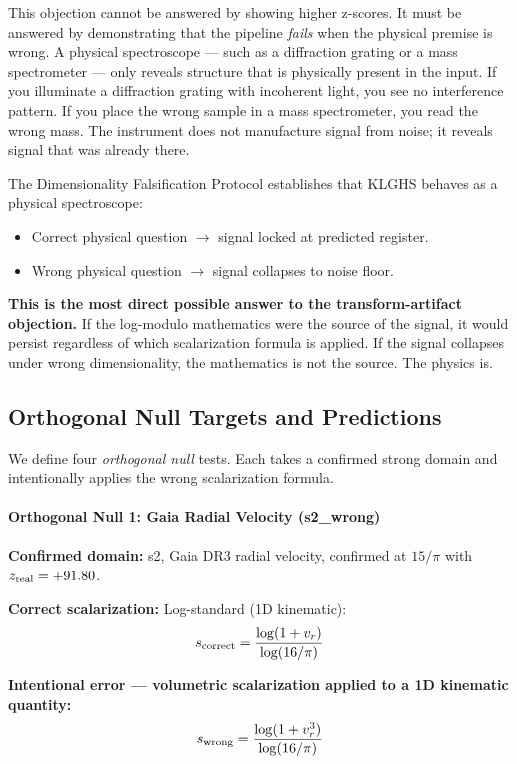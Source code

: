 \documentclass[12pt,a4paper]{article}
\begin{document}
This objection cannot be answered by showing higher z-scores. It must be
answered by demonstrating that the pipeline \emph{fails} when the physical
premise is wrong. A physical spectroscope --- such as a diffraction grating or a mass
spectrometer --- only reveals structure that is physically present in the input.
If you illuminate a diffraction grating with incoherent light, you see no
interference pattern. If you place the wrong sample in a mass spectrometer, you
read the wrong mass. The instrument does not manufacture signal from noise; it
reveals signal that was already there.

The Dimensionality Falsification Protocol establishes that KLGHS behaves as a
physical spectroscope:
\begin{itemize}
  \item Correct physical question $\rightarrow$ signal locked at predicted register.
  \item Wrong physical question $\rightarrow$ signal collapses to noise floor.
\end{itemize}

\textbf{This is the most direct possible answer to the transform-artifact
objection.} If the log-modulo mathematics were the source of the signal, it
would persist regardless of which scalarization formula is applied. If the
signal collapses under wrong dimensionality, the mathematics is not the source.
The physics is.

\subsection{Orthogonal Null Targets and Predictions}

We define four \emph{orthogonal null} tests. Each takes a confirmed strong
domain and intentionally applies the wrong scalarization formula.
\vspace{0.5em}

\paragraph{Orthogonal Null 1: Gaia Radial Velocity (s2\_wrong)}

\textbf{Confirmed domain:} s2, Gaia DR3 radial velocity, confirmed at $15/\pi$
with $z_{\rm real} = +91.80$.

\textbf{Correct scalarization:} Log-standard (1D kinematic):
\[
  s_{\rm correct} = \frac{\log(1 + v_r)}{\log(16/\pi)}
\]

\textbf{Intentional error --- volumetric scalarization applied to a 1D kinematic
quantity:}
\[
  s_{\rm wrong} = \frac{\log(1 + v_r^3)}{\log(16/\pi)}
\]
\end{document}
